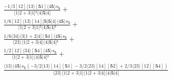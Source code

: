 \documentclass[varwidth, border=5pt]{standalone}
\begin{document}
\begin{my}
$\begin{gathered}
\scriptscriptstyle\frac{-1/3[12]⟨13⟩[𝟓1]⟨4𝟓⟩s_{𝟓}}{⟨1|2+3|1]²⟨4|𝟓|4]} +\\
\scriptscriptstyle\frac{1/6[12]⟨13⟩[14][𝟓|𝟓|4⟩⟨4𝟓⟩s_{𝟓}}{⟨1|2+3|1]²⟨4|𝟓|4]²} +\\
\scriptscriptstyle\frac{1/6⟨34⟩⟨3|1+2|4][𝟓4]⟨4𝟓⟩s_{𝟓}}{⟨23⟩⟨1|2+3|4]⟨4|𝟓|4]²} +\\
\scriptscriptstyle\frac{1/2[12]⟨34⟩[𝟓4]⟨4𝟓⟩s_{𝟓}}{⟨1|2+3|1]⟨4|𝟓|4]²} +\\
\scriptscriptstyle\frac{⟨13⟩⟨4𝟓⟩s_{𝟓}(-3/2⟨13⟩[14][𝟓1]-3/2⟨23⟩[14][𝟓2]+2/3⟨23⟩[12][𝟓4])}{⟨23⟩⟨1|2+3|1]⟨1|2+3|4]⟨4|𝟓|4]} \phantom{+}
\end{gathered}$
\end{my}
\end{document}
